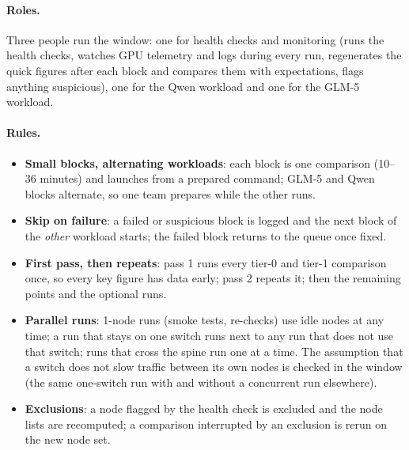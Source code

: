 \paragraph{Roles.} Three people run the window: one for health checks and monitoring (runs the health
checks, watches GPU telemetry and logs during every run, regenerates the quick figures after each block and
compares them with expectations, flags anything suspicious), one for the Qwen workload and one for the GLM-5
workload.

\paragraph{Rules.}
\begin{itemize}[leftmargin=*, itemsep=1pt]
  \item \textbf{Small blocks, alternating workloads}: each block is one comparison (10--36 minutes) and
        launches from a prepared command; GLM-5 and Qwen blocks alternate, so one team prepares while the
        other runs.
  \item \textbf{Skip on failure}: a failed or suspicious block is logged and the next block of the
        \emph{other} workload starts; the failed block returns to the queue once fixed.
  \item \textbf{First pass, then repeats}: pass 1 runs every tier-0 and tier-1 comparison once, so every key
        figure has data early; pass 2 repeats it; then the remaining points and the optional runs.
  \item \textbf{Parallel runs}: 1-node runs (smoke tests, re-checks) use idle nodes at any time; a run that
        stays on one switch runs next to any run that does not use that switch; runs that cross the spine run
        one at a time. The assumption that a switch does not slow traffic between its own nodes is checked in
        the window (the same one-switch run with and without a concurrent run elsewhere).
  \item \textbf{Exclusions}: a node flagged by the health check is excluded and the node lists are
        recomputed; a comparison interrupted by an exclusion is rerun on the new node set.
\end{itemize}

